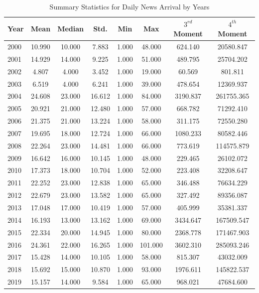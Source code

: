 \documentclass[12pt]{article}
\begin{document}
	\begin{table}[H]
		\centering
		\small
		\caption{Summary Statistics for Daily News Arrival by Years}
		\begin{tabular}{l | c c c c c c c}
		\toprule
		Year & Mean & Median & Std. & Min & Max & $3^{rd}$ Moment & $4^{th}$ Moment \\
		\midrule
2000 & 10.990 & 10.000 & 7.883 & 1.000 & 48.000 & 624.140 & 20580.847\\
2001 & 14.929 & 14.000 & 9.225 & 1.000 & 51.000 & 489.795 & 25704.202\\
2002 & 4.807 & 4.000 & 3.452 & 1.000 & 19.000 & 60.569 & 801.811\\
2003 & 6.519 & 4.000 & 6.241 & 1.000 & 39.000 & 478.654 & 12369.937\\
2004 & 24.608 & 23.000 & 16.612 & 1.000 & 84.000 & 3190.837 & 261755.365\\
2005 & 20.921 & 21.000 & 12.480 & 1.000 & 57.000 & 668.782 & 71292.410\\
2006 & 21.375 & 21.000 & 13.224 & 1.000 & 58.000 & 311.175 & 72550.280\\
2007 & 19.695 & 18.000 & 12.724 & 1.000 & 66.000 & 1080.233 & 80582.446\\
2008 & 22.264 & 23.000 & 14.481 & 1.000 & 66.000 & 773.619 & 114575.879\\
2009 & 16.642 & 16.000 & 10.145 & 1.000 & 48.000 & 229.465 & 26102.072\\
2010 & 17.373 & 18.000 & 10.704 & 1.000 & 52.000 & 223.408 & 32208.647\\
2011 & 22.252 & 23.000 & 12.838 & 1.000 & 65.000 & 346.488 & 76634.229\\
2012 & 22.679 & 23.000 & 13.582 & 1.000 & 65.000 & 327.492 & 89356.087\\
2013 & 17.048 & 17.000 & 10.419 & 1.000 & 57.000 & 405.999 & 35381.337\\
2014 & 16.193 & 13.000 & 13.162 & 1.000 & 69.000 & 3434.647 & 167509.547\\
2015 & 22.334 & 20.000 & 14.945 & 1.000 & 80.000 & 2368.778 & 171467.903\\
2016 & 24.361 & 22.000 & 16.265 & 1.000 & 101.000 & 3602.310 & 285093.246\\
2017 & 15.428 & 14.000 & 10.105 & 1.000 & 58.000 & 815.307 & 43032.009\\
2018 & 15.692 & 15.000 & 10.870 & 1.000 & 93.000 & 1976.611 & 145822.537\\
2019 & 15.157 & 14.000 & 9.584 & 1.000 & 65.000 & 968.021 & 47684.600\\
		\bottomrule
		\end{tabular}
	\end{table}
	
\end{document}
